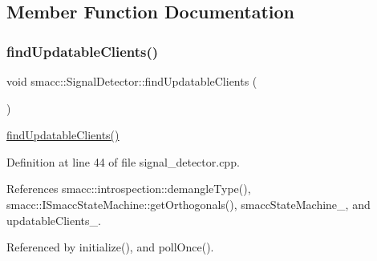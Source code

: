 \subsection{Member Function Documentation}
\mbox{\label{classsmacc_1_1SignalDetector_a47ec2df560e2e33758ce3975bece9385}} 
\subsubsection{\texorpdfstring{find\+Updatable\+Clients()}{findUpdatableClients()}}
{\footnotesize\ttfamily void smacc\+::\+Signal\+Detector\+::find\+Updatable\+Clients (\begin{DoxyParamCaption}{ }\end{DoxyParamCaption})\hspace{0.3cm}{\ttfamily [private]}}

\hyperlink{classsmacc_1_1SignalDetector_a47ec2df560e2e33758ce3975bece9385}{find\+Updatable\+Clients()} 

Definition at line 44 of file signal\+\_\+detector.\+cpp.



References smacc\+::introspection\+::demangle\+Type(), smacc\+::\+I\+Smacc\+State\+Machine\+::get\+Orthogonals(), smacc\+State\+Machine\+\_\+, and updatable\+Clients\+\_\+.



Referenced by initialize(), and poll\+Once().


